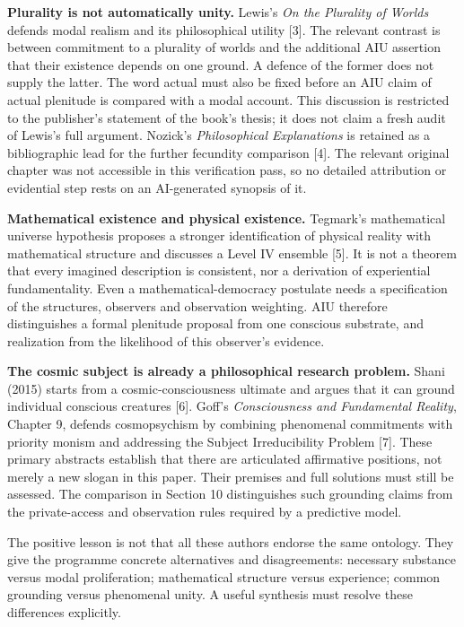 \documentclass[
  10pt,
  a4paper,
]{article}
\begin{document}
\textbf{Plurality is not automatically unity.} Lewis's \emph{On the
Plurality of Worlds} defends modal realism and its philosophical utility
{[}3{]}. The relevant contrast is between commitment to a plurality of
worlds and the additional AIU assertion that their existence depends on
one ground. A defence of the former does not supply the latter. The word
actual must also be fixed before an AIU claim of actual plenitude is
compared with a modal account. This discussion is restricted to the
publisher's statement of the book's thesis; it does not claim a fresh
audit of Lewis's full argument. Nozick's \emph{Philosophical
Explanations} is retained as a bibliographic lead for the further
fecundity comparison {[}4{]}. The relevant original chapter was not
accessible in this verification pass, so no detailed attribution or
evidential step rests on an AI-generated synopsis of it.

\textbf{Mathematical existence and physical existence.} Tegmark's
mathematical universe hypothesis proposes a stronger identification of
physical reality with mathematical structure and discusses a Level IV
ensemble {[}5{]}. It is not a theorem that every imagined description is
consistent, nor a derivation of experiential fundamentality. Even a
mathematical-democracy postulate needs a specification of the
structures, observers and observation weighting. AIU therefore
distinguishes a formal plenitude proposal from one conscious substrate,
and realization from the likelihood of this observer's evidence.

\textbf{The cosmic subject is already a philosophical research problem.}
Shani (2015) starts from a cosmic-consciousness ultimate and argues that
it can ground individual conscious creatures {[}6{]}. Goff's
\emph{Consciousness and Fundamental Reality}, Chapter 9, defends
cosmopsychism by combining phenomenal commitments with priority monism
and addressing the Subject Irreducibility Problem {[}7{]}. These primary
abstracts establish that there are articulated affirmative positions,
not merely a new slogan in this paper. Their premises and full solutions
must still be assessed. The comparison in Section 10 distinguishes such
grounding claims from the private-access and observation rules required
by a predictive model.

The positive lesson is not that all these authors endorse the same
ontology. They give the programme concrete alternatives and
disagreements: necessary substance versus modal proliferation;
mathematical structure versus experience; common grounding versus
phenomenal unity. A useful synthesis must resolve these differences
explicitly.
\end{document}
